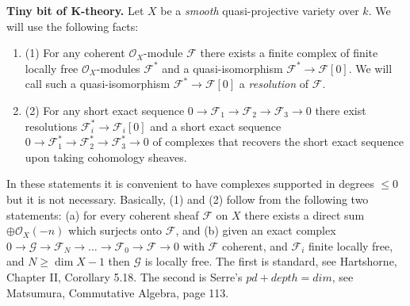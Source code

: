 \medskip\noindent
{\bf Tiny bit of K-theory.} Let $X$ be a {\it smooth}
quasi-projective variety over $k$. We will use the
following facts:
\begin{enumerate}
\item{(1)} For any coherent ${\mathcal O}_X$-module ${\mathcal F}$
there exists a finite complex of finite locally free
${\mathcal O}_X$-modules ${\mathcal F}^*$ and a quasi-isomorphism
${\mathcal F}^* \to {\mathcal F}[0]$. We will call such a quasi-isomorphism
${\mathcal F}^* \to {\mathcal F}[0]$ a {\it resolution} of ${\mathcal F}$.
\item{(2)} For any short exact sequence
$
0
\to
{\mathcal F}_1
\to 
{\mathcal F}_2
\to 
{\mathcal F}_3
\to 
0
$
there exist resolutions ${\mathcal F}_i^* \to {\mathcal F}_i[0]$
and a short exact sequence 
$
0
\to
{\mathcal F}_1^*
\to 
{\mathcal F}_2^*
\to 
{\mathcal F}_3^*
\to 
0
$
of complexes that recovers the short exact sequence
upon taking cohomology sheaves.
\end{enumerate}
In these statements it is convenient to have complexes supported in
degrees $\leq 0$ but it is not necessary. 
Basically, (1) and (2) follow from the following two statements:
(a) for every coherent sheaf ${\mathcal F}$ on $X$ there exists a direct
sum $\oplus {\mathcal O}_X(-n)$ which surjects onto ${\mathcal F}$, and
(b) given an exact complex $0\to {\mathcal G} \to {\mathcal F}_{N}
\to \ldots \to {\mathcal F}_0 \to {\mathcal F} \to 0$ with ${\mathcal F}$
coherent, and ${\mathcal F}_i$ finite locally free, and $N \geq \dim X -1$
then ${\mathcal G}$ is locally free. The first is standard, see
Hartshorne, Chapter II, Corollary 5.18. The second is Serre's
$pd+depth=dim$, see Matsumura, Commutative Algebra, page 113.

